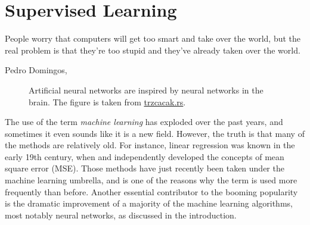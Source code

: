 \chapter{Supervised Learning} \label{chp:machinelearning}
\epigraph{People worry that computers will get too smart and take over the world, but the real problem is that they're too stupid and they've already taken over the world.}{Pedro Domingos, \supercite{domingos_master_2015}}
\begin{figure}[H]
	\centering
	\caption{Artificial neural networks are inspired by neural networks in the brain. The figure is taken from  \href{http://www.trzcacak.rs}{trzcacak.rs}.}
\end{figure}

The use of the term \textit{machine learning} has exploded over the past years, and sometimes it even sounds like it is a new field. However, the truth is that many of the methods are relatively old. For instance, linear regression was known in the early 19th century, when \citet{legendre_nouvelles_1805} and \citet{gauss_theoria_1809} independently developed the concepts of mean square error (MSE). Those methods have just recently been taken under the machine learning umbrella, and is one of the reasons why the term is used more frequently than before. Another essential contributor to the booming popularity is the dramatic improvement of a majority of the machine learning algorithms, most notably neural networks, as discussed in the introduction.

